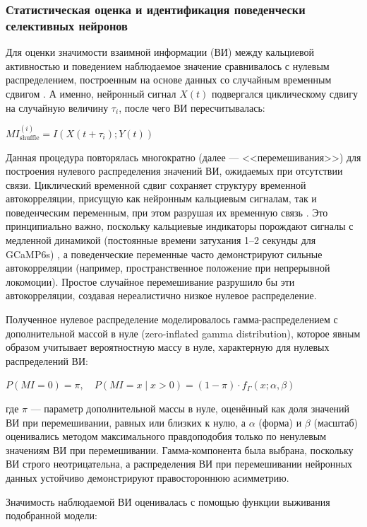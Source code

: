 \subsubsection{Статистическая оценка и идентификация поведенчески селективных нейронов}
\label{sec:statistical_assessment}

Для оценки значимости взаимной информации (ВИ) между кальциевой активностью и поведением наблюдаемое значение сравнивалось с нулевым распределением, построенным на основе данных со случайным временным сдвигом \cite{skaggs1993information}.
А именно, нейронный сигнал $X(t)$ подвергался
циклическому сдвигу на случайную величину $\tau_i$, после чего ВИ пересчитывалась:

$MI_{\text{shuffle}}^{(i)} = I(X(t + \tau_i); Y(t))$

Данная процедура повторялась многократно (далее --- <<перемешивания>>)
для построения нулевого распределения значений ВИ, ожидаемых при отсутствии связи. Циклический временной сдвиг сохраняет структуру временной
автокорреляции, присущую как нейронным кальциевым сигналам, так и поведенческим переменным, при этом разрушая их временную связь \cite{Lancaster2018}.
Это принципиально важно, поскольку кальциевые индикаторы порождают сигналы с медленной динамикой (постоянные времени затухания 1--2 секунды для GCaMP6s) \cite{Chen2013}, а поведенческие переменные часто демонстрируют сильные автокорреляции (например, пространственное положение при непрерывной локомоции).
Простое случайное перемешивание разрушило бы эти автокорреляции, создавая нереалистично низкое нулевое распределение.


Полученное нулевое распределение моделировалось гамма-распределением с дополнительной массой в нуле (zero-inflated gamma distribution), которое явным образом учитывает вероятностную массу в нуле, характерную для нулевых распределений ВИ:

$P(MI = 0) = \pi, \quad P(MI = x \mid x > 0) = (1 - \pi) \cdot f_\Gamma(x; \alpha, \beta)$

где $\pi$ --- параметр дополнительной массы в нуле, оценённый как доля значений ВИ при перемешивании, равных или близких к нулю, а $\alpha$ (форма) и $\beta$ (масштаб) оценивались методом максимального правдоподобия только по ненулевым значениям ВИ при перемешивании. Гамма-компонента была выбрана, поскольку ВИ строго неотрицательна, а распределения ВИ при перемешивании нейронных данных устойчиво демонстрируют правостороннюю асимметрию.

Значимость наблюдаемой ВИ оценивалась с помощью функции выживания подобранной модели:

